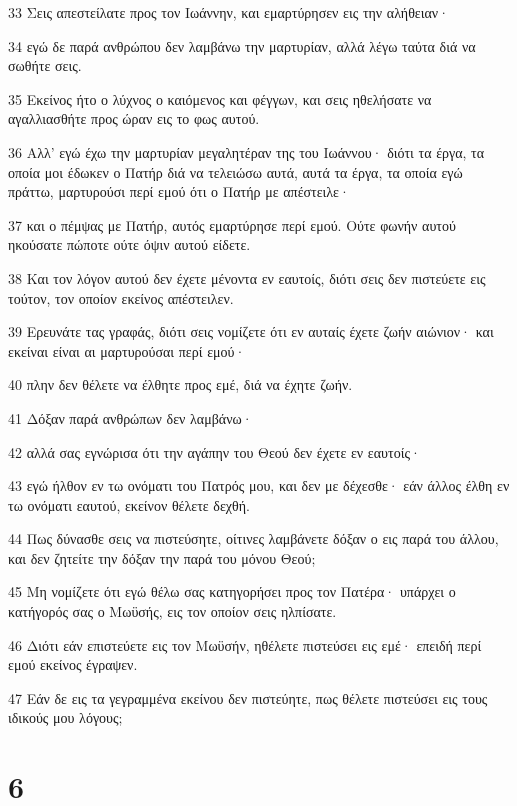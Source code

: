 \par 33 Σεις απεστείλατε προς τον Ιωάννην, και εμαρτύρησεν εις την αλήθειαν·
\par 34 εγώ δε παρά ανθρώπου δεν λαμβάνω την μαρτυρίαν, αλλά λέγω ταύτα διά να σωθήτε σεις.
\par 35 Εκείνος ήτο ο λύχνος ο καιόμενος και φέγγων, και σεις ηθελήσατε να αγαλλιασθήτε προς ώραν εις το φως αυτού.
\par 36 Αλλ' εγώ έχω την μαρτυρίαν μεγαλητέραν της του Ιωάννου· διότι τα έργα, τα οποία μοι έδωκεν ο Πατήρ διά να τελειώσω αυτά, αυτά τα έργα, τα οποία εγώ πράττω, μαρτυρούσι περί εμού ότι ο Πατήρ με απέστειλε·
\par 37 και ο πέμψας με Πατήρ, αυτός εμαρτύρησε περί εμού. Ούτε φωνήν αυτού ηκούσατε πώποτε ούτε όψιν αυτού είδετε.
\par 38 Και τον λόγον αυτού δεν έχετε μένοντα εν εαυτοίς, διότι σεις δεν πιστεύετε εις τούτον, τον οποίον εκείνος απέστειλεν.
\par 39 Ερευνάτε τας γραφάς, διότι σεις νομίζετε ότι εν αυταίς έχετε ζωήν αιώνιον· και εκείναι είναι αι μαρτυρούσαι περί εμού·
\par 40 πλην δεν θέλετε να έλθητε προς εμέ, διά να έχητε ζωήν.
\par 41 Δόξαν παρά ανθρώπων δεν λαμβάνω·
\par 42 αλλά σας εγνώρισα ότι την αγάπην του Θεού δεν έχετε εν εαυτοίς·
\par 43 εγώ ήλθον εν τω ονόματι του Πατρός μου, και δεν με δέχεσθε· εάν άλλος έλθη εν τω ονόματι εαυτού, εκείνον θέλετε δεχθή.
\par 44 Πως δύνασθε σεις να πιστεύσητε, οίτινες λαμβάνετε δόξαν ο εις παρά του άλλου, και δεν ζητείτε την δόξαν την παρά του μόνου Θεού;
\par 45 Μη νομίζετε ότι εγώ θέλω σας κατηγορήσει προς τον Πατέρα· υπάρχει ο κατήγορός σας ο Μωϋσής, εις τον οποίον σεις ηλπίσατε.
\par 46 Διότι εάν επιστεύετε εις τον Μωϋσήν, ηθέλετε πιστεύσει εις εμέ· επειδή περί εμού εκείνος έγραψεν.
\par 47 Εάν δε εις τα γεγραμμένα εκείνου δεν πιστεύητε, πως θέλετε πιστεύσει εις τους ιδικούς μου λόγους;

\chapter{6}

